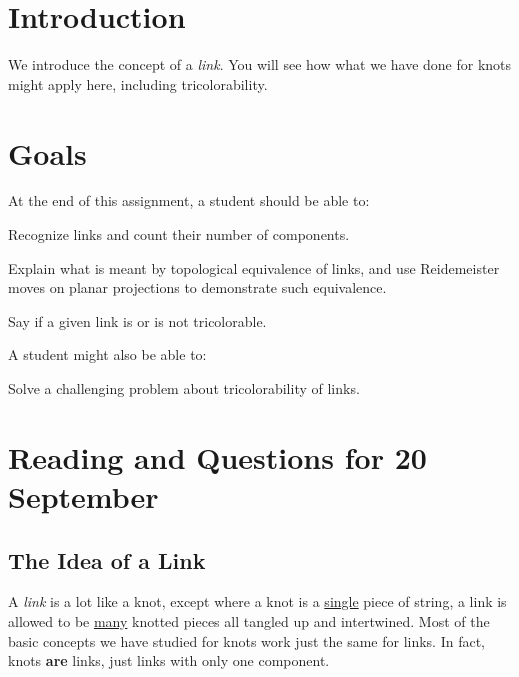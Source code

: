 \documentclass[12pt,letterpaper]{article}
\theoremstyle{definition}
\begin{document}
\setlength{\parskip}{1ex plus 0.5ex minus 0.2ex}
\setlength{\parindent}{0pt}

\pagestyle{fancy}
\cfoot{}

\section*{Introduction}
We introduce the concept of a \emph{link}. 
You will see how what we have done for knots might apply here, including tricolorability. 

\section*{Goals}
At the end of this assignment, a student should be able to:
\begin{compactitem}
\item Recognize links and count their number of components.
\item Explain what is meant by topological equivalence of links, and use Reidemeister moves on planar projections to demonstrate such equivalence.
\item Say if a given link is or is not tricolorable.
\end{compactitem}
A student might also be able to:
\begin{compactitem}
\item Solve a challenging problem about tricolorability of links.
\end{compactitem}

\section*{Reading and Questions for 20 September}

\subsection*{The Idea of a Link}

A \emph{link} is a lot like a knot, except where a knot is a \underline{single} piece of string, a link is allowed to be \underline{many} knotted pieces all tangled up and intertwined.
Most of the basic concepts we have studied for knots work just the same for links.
In fact, knots \textbf{are} links, just links with only one component.
\end{document}
